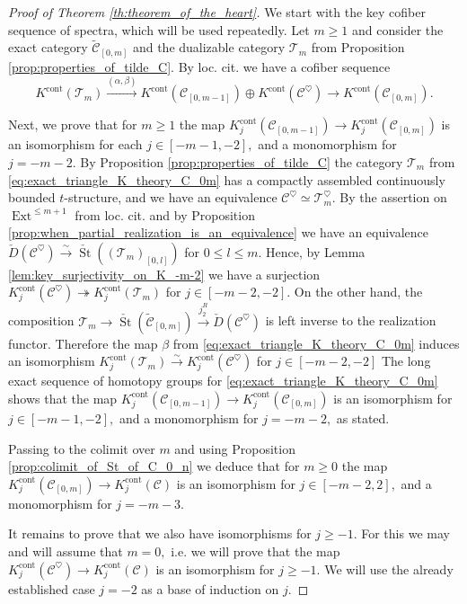 \documentclass[11pt,leqno]{amsart}
\numberwithin{equation}{section}
\def\wt{\widetilde}
\newcommand{\xto}{\xrightarrow}
\newcommand{\onto}{\twoheadrightarrow}
\newcommand{\cont}{\operatorname{cont}}
\newcommand{\St}{\operatorname{St}}
\newcommand{\cC}{{\mathcal C}}
\newcommand{\cT}{{\mathcal T}}
\newcommand{\Ext}{\operatorname{Ext}}
\begin{document}
\begin{proof}[Proof of Theorem \ref{th:theorem_of_the_heart}] We start with the key cofiber sequence of spectra, which will be used repeatedly. Let $m\geq 1$ and consider the exact category $\wt{\cC}_{[0,m]}$ and the dualizable category $\cT_m$ from Proposition \ref{prop:properties_of_tilde_C}. By loc. cit. we have a cofiber sequence
\begin{equation}\label{eq:exact_triangle_K_theory_C_0m}
K^{\cont}(\cT_m)\xto{(\alpha,\beta)} K^{\cont}(\cC_{[0,m-1]})\oplus K^{\cont}(\cC^{\heartsuit})\to K^{\cont}(\cC_{[0,m]}).
\end{equation}
	
 Next, we prove that for $m\geq 1$ the map $K_{j}^{\cont}(\cC_{[0,m-1]})\to K_{j}^{\cont}(\cC_{[0,m]})$ is an isomorphism for each $j\in [-m-1,-2],$ and a monomorphism for $j=-m-2.$ By Proposition \ref{prop:properties_of_tilde_C} the category $\cT_m$ from \eqref{eq:exact_triangle_K_theory_C_0m} has a compactly assembled continuously bounded $t$-structure, and we have an equivalence $\cC^{\heartsuit}\simeq \cT_m^{\heartsuit}.$ By the assertion on $\Ext^{\leq m+1}$ from loc. cit. and by Proposition \ref{prop:when_partial_realization_is_an_equivalence} we have an equivalence $\check{D}(\cC^{\heartsuit})\xto{\sim}\check{\St}((\cT_m)_{[0,l]})$ for $0\leq l\leq m.$ Hence, by Lemma \ref{lem:key_surjectivity_on_K_-m-2} we have a surjection $K_{j}^{\cont}(\cC^{\heartsuit})\onto K_{j}^{\cont}(\cT_m)$ for $j\in [-m-2,-2].$ On the other hand, the composition $\cT_m\to\check{\St}(\wt{\cC}_{[0,m]})\xto{j_2^R}\check{D}(\cC^{\heartsuit})$ is left inverse to the realization functor. Therefore the map $\beta$ from \eqref{eq:exact_triangle_K_theory_C_0m} induces an isomorphism $K_{j}^{\cont}(\cT_m)\xto{\sim} K_{j}^{\cont}(\cC^{\heartsuit})$ for $j\in [-m-2,-2]$ The long exact sequence of homotopy groups for \eqref{eq:exact_triangle_K_theory_C_0m} shows that the map $K_{j}^{\cont}(\cC_{[0,m-1]})\to K_{j}^{\cont}(\cC_{[0,m]})$ is an isomorphism for $j\in [-m-1,-2],$ and a monomorphism for $j=-m-2,$ as stated. 
 
 Passing to the colimit over $m$ and using Proposition \ref{prop:colimit_of_St_of_C_0_n} we deduce that for $m\geq 0$ the map $K_{j}^{\cont}(\cC_{[0,m]})\to K_{j}^{\cont}(\cC)$ is an isomorphism for $j\in [-m-2,2],$ and a monomorphism for $j=-m-3.$ 
 
 It remains to prove that we also have isomorphisms for $j\geq -1.$ For this we may and will assume that $m=0,$ i.e. we will prove that the map $K_j^{\cont}(\cC^{\heartsuit})\to K_j^{\cont}(\cC)$ is an isomorphism for $j\geq -1.$ We will use the already established case $j=-2$ as a base of induction on $j.$
 

\end{proof}
\end{document}
